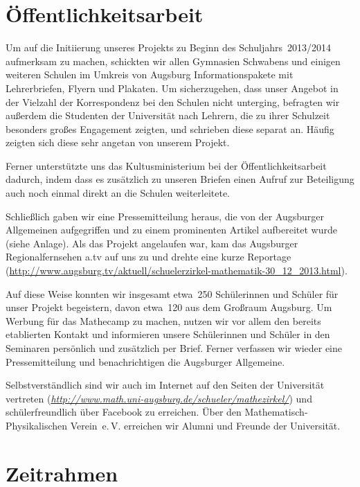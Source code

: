 \documentclass[12pt]{zettel}
\begin{document}
\section{Öffentlichkeitsarbeit}

Um auf die Initiierung unseres Projekts zu Beginn des Schuljahrs~2013/2014
aufmerksam zu machen, schickten wir allen Gymnasien Schwabens und einigen
weiteren Schulen im Umkreis von Augsburg Informationspakete mit Lehrerbriefen,
Flyern und Plakaten. Um sicherzugehen, dass unser Angebot in der
Vielzahl der Korrespondenz bei den Schulen nicht unterging, befragten wir außerdem
die Studenten der Universität nach Lehrern, die zu ihrer Schulzeit
besonders großes Engagement zeigten, und schrieben diese separat an.
Häufig zeigten sich diese sehr angetan von unserem Projekt.

Ferner unterstützte uns das Kultusministerium bei der Öffentlichkeitsarbeit
dadurch, indem dass es zusätzlich zu unseren Briefen einen Aufruf zur
Beteiligung auch noch einmal direkt an die Schulen weiterleitete.

Schließlich gaben wir eine Pressemitteilung heraus, die von der
Augsburger Allgemeinen aufgegriffen und zu einem prominenten Artikel aufbereitet
wurde (siehe Anlage). Als das Projekt angelaufen war, kam das Augsburger
Regionalfernsehen a.tv auf uns zu und drehte eine kurze Reportage
(\href{http://www.augsburg.tv/aktuell/schuelerzirkel-mathematik-30_12_2013.html}{\textsf{http:/\!/www.augsburg.tv/aktuell/schuelerzirkel-mathematik-30\_{}12\_{}2013.html}}).

Auf diese Weise konnten wir insgesamt etwa~250 Schülerinnen und Schüler für
unser Projekt begeistern, davon etwa~120 aus dem Großraum Augsburg. Um Werbung für
das Mathecamp zu machen, nutzen wir vor allem den bereits etablierten Kontakt
und informieren unsere Schülerinnen und Schüler in den Seminaren persönlich und
zusätzlich per Brief. Ferner verfassen wir wieder eine Pressemitteilung und
benachrichtigen die Augsburger Allgemeine.

Selbstverständlich sind wir auch im Internet auf den Seiten der Universität
vertreten
(\href{http://www.math.uni-augsburg.de/schueler/mathezirkel/}{\textsl{http:/\!/www.math.uni-augsburg.de/schueler/mathezirkel/}})
und schülerfreundlich über Facebook zu erreichen. Über den
Mathematisch-Physikalischen Verein~e.\,V. erreichen wir Alumni und Freunde der
Universität.


\section{Zeitrahmen}
\end{document}
